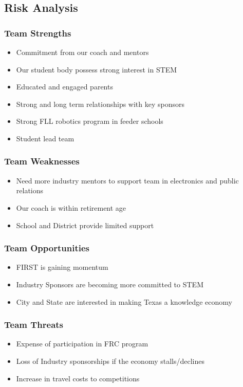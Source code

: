 \clearpage
\newpage

\subsection{Risk Analysis}
\subsubsection{Team Strengths}
\begin{itemize}
	\item Commitment from our coach and mentors
	\item Our student body possess strong interest in STEM
	\item Educated and engaged parents
	\item Strong and long term relationships with key sponsors
	\item Strong FLL robotics program in feeder schools
	\item Student lead team
\end{itemize}

\subsubsection{Team Weaknesses}
\begin{itemize}
	\item Need more industry mentors to support team in electronics and public relations
	\item Our coach is within retirement age
	\item School and District provide limited support
\end{itemize}

\subsubsection{Team Opportunities}
\begin{itemize}
	\item FIRST is gaining momentum
	\item Industry Sponsors are becoming more committed to STEM
	\item City and State are interested in making Texas a knowledge economy
\end{itemize}

\subsubsection{Team Threats}
\begin{itemize}
	\item Expense of participation in FRC program
	\item Loss of Industry sponsorships if the economy stalls/declines 
	\item Increase in travel costs to competitions
\end{itemize}

